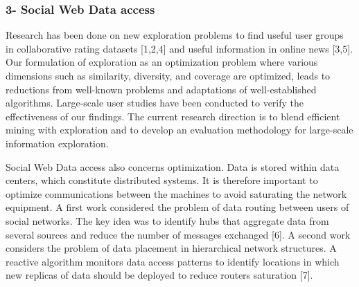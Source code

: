 \subsubsection*{3- Social Web Data access}


Research has been done on new exploration problems to find useful user groups in collaborative rating datasets [1,2,4] and useful information in online news [3,5]. Our formulation of exploration as an optimization problem where various dimensions such as similarity, diversity, and coverage are optimized, leads to reductions from well-known problems and adaptations of well-established algorithms. Large-scale user studies have been conducted to verify the effectiveness of our findings. The current research direction is to blend efficient mining with exploration and to develop an evaluation methodology for large-scale information exploration.

Social Web Data access also concerns optimization. Data is stored within data centers, which constitute distributed systems. It is therefore important to optimize communications between the machines to avoid saturating the network equipment. A first work considered the problem of data routing between users of social networks. The key idea was to identify hubs that aggregate data from several sources and reduce the number of messages exchanged [6]. A second work considers the problem of data placement in hierarchical network structures. A reactive algorithm monitors data access patterns to identify locations in which new replicas of data should be deployed to reduce routers saturation [7].

